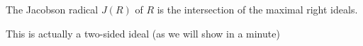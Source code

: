 The Jacobson radical $J(R)$ of $R$ is the intersection of the maximal
right ideals.

This is actually a two-sided ideal (as we will show in a minute)
